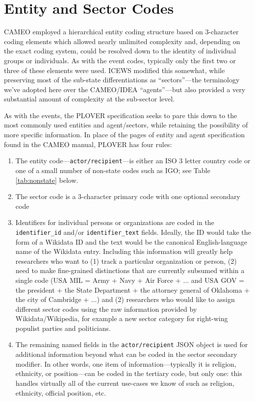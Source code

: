 \documentclass[11pt]{report}
\newcommand{\txt}[1]{\texttt{#1}}
\begin{document}

\chapter{Entity and Sector Codes}

CAMEO employed a hierarchical entity coding structure based on 3-character coding elements which allowed nearly unlimited complexity and, depending on the exact coding system, could be resolved down to the identity of individual groups or individuals. As with the event codes, typically only the first two or three of these elements were used. ICEWS modified this somewhat, while preserving most of the sub-state differentiations as ``sectors''---the terminology we've adopted here over the CAMEO/IDEA ``agents''---but also provided a very substantial amount of complexity at the sub-sector level.

As with the events, the PLOVER specification seeks to pare this down to the most commonly used entities and agent/sectors, while retaining the possibility of more specific information. In place of the pages of entity and agent specification found in the CAMEO manual, PLOVER has four rules:

\begin{enumerate}
\item The entity code---\texttt{actor/recipient}---is either an ISO 3 letter country code or one of a small number of non-state codes such as IGO; see Table \ref{tab:nonstate} below.
\item The sector code is a 3-character primary code with one optional secondary code
\item Identifiers for individual persons or organizations are coded in the \texttt{identifier\_id} and/or \texttt{identifier\_text} fields. Ideally, the ID would take the form of a Wikidata ID and the text would be the canonical English-language name of the Wikidata entry. Including this information will greatly help researchers who want to (1) track a particular organization or person, (2) need to make fine-grained distinctions that are currently subsumed within a single code (USA MIL = Army + Navy + Air Force + ... and USA GOV = the president + the State Department + the attorney general of Oklahoma + the city of Cambridge + ...) and (2) researchers who would like to assign different sector codes using the raw information provided by Wikidata/Wikipedia, for example a new sector category for right-wing populist parties and politicians.
\item The remaining named fields in the \txt{actor/recipient} JSON object is used for additional information beyond what can be coded in the sector secondary modifier. In other words, one item of information---typically it is religion, ethnicity, or position---can be coded in the tertiary code, but only one: this handles virtually all of the current use-cases we know of such as religion, ethnicity, official position, etc.
\end{enumerate}
\end{document}
